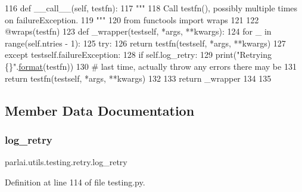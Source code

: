 \begin{DoxyCode}
116     \textcolor{keyword}{def }\_\_call\_\_(self, testfn):
117         \textcolor{stringliteral}{"""}
118 \textcolor{stringliteral}{        Call testfn(), possibly multiple times on failureException.}
119 \textcolor{stringliteral}{        """}
120         \textcolor{keyword}{from} functools \textcolor{keyword}{import} wraps
121 
122         @wraps(testfn)
123         \textcolor{keyword}{def }\_wrapper(testself, *args, **kwargs):
124             \textcolor{keywordflow}{for} \_ \textcolor{keywordflow}{in} range(self.ntries - 1):
125                 \textcolor{keywordflow}{try}:
126                     \textcolor{keywordflow}{return} testfn(testself, *args, **kwargs)
127                 \textcolor{keywordflow}{except} testself.failureException:
128                     \textcolor{keywordflow}{if} self.log\_retry:
129                         print(\textcolor{stringliteral}{"Retrying \{\}"}.\hyperlink{namespaceparlai_1_1chat__service_1_1services_1_1messenger_1_1shared__utils_a32e2e2022b824fbaf80c747160b52a76}{format}(testfn))
130             \textcolor{comment}{# last time, actually throw any errors there may be}
131             \textcolor{keywordflow}{return} testfn(testself, *args, **kwargs)
132 
133         \textcolor{keywordflow}{return} \_wrapper
134 
135 
\end{DoxyCode}


\subsection{Member Data Documentation}
\mbox{\label{classparlai_1_1utils_1_1testing_1_1retry_a69ead6d82dec33d05ba94a3d561e6dfc}} 
\subsubsection{\texorpdfstring{log\+\_\+retry}{log\_retry}}
{\footnotesize\ttfamily parlai.\+utils.\+testing.\+retry.\+log\+\_\+retry}



Definition at line 114 of file testing.\+py.

\mbox{\label{classparlai_1_1utils_1_1testing_1_1retry_abd5233dc28b07a53cd11347e5e44c44f}} 
